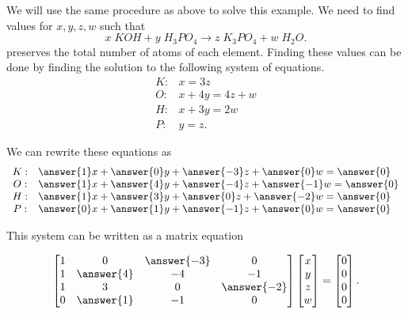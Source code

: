 \documentclass{ximera}
\begin{document}
\begin{exploration}
\begin{example}
\begin{solution}
  We will use the same procedure as above to solve this example. We
  need to find values for $x,y,z,w$ such that
  \begin{equation*}
    x\;KOH+y\;H_3PO_4\rightarrow z\;K_3PO_4+w\;H_2O.
  \end{equation*}
  preserves the total number of atoms of each element.  Finding these
  values can be done by finding the solution to the following system
  of equations.
  \begin{equation*}
    \begin{array}{cl}
      K: & x=3z \\
      O: & x+4y=4z+w \\
      H: & x+3y=2w \\
      P: & y=z.
    \end{array}
  \end{equation*}
 
  We can rewrite these equations as
  \begin{equation*}
    \begin{array}{cl}
      K: & \answer{1}x + \answer{0}y + \answer{-3}z + \answer{0}w = \answer{0} \\
      O: & \answer{1}x + \answer{4}y + \answer{-4}z + \answer{-1}w = \answer{0} \\
      H: & \answer{1}x + \answer{3}y + \answer{0}z + \answer{-2}w = \answer{0} \\
      P: & \answer{0}x + \answer{1}y + \answer{-1}z + \answer{0}w = \answer{0}
    \end{array}
  \end{equation*}

  This system can be written as a matrix equation

  \begin{equation*}
    \begin{bmatrix}
      1 & 0 & \answer{-3} & 0 \\
      1 & \answer{4} & -4 & -1 \\
      1 & 3 & 0 & \answer{-2} \\
      0 & \answer{1} & -1 & 0
    \end{bmatrix}
    \begin{bmatrix}
      x \\
      y \\
      z \\
      w
    \end{bmatrix}
    =
    \begin{bmatrix}
      0 \\
      0 \\
      0 \\
      0
    \end{bmatrix}.
  \end{equation*}


\end{solution}
\end{example}
\end{exploration}
\end{document}

